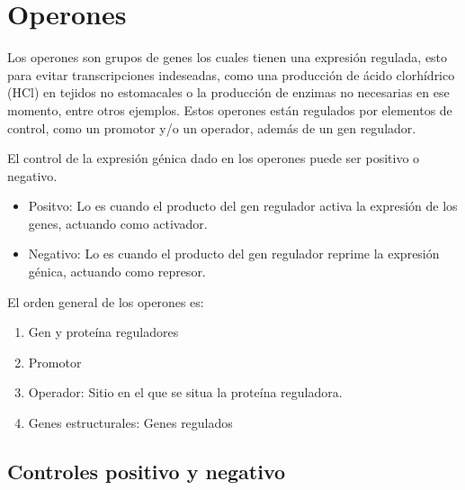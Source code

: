 

\section{Operones}

Los operones son grupos de genes los cuales tienen una expresión regulada, esto para evitar transcripciones indeseadas, como una producción de ácido clorhídrico (HCl) en tejidos no estomacales o la producción de enzimas no necesarias en ese momento, entre otros ejemplos. Estos operones están regulados por elementos de control, como un promotor y/o un operador, además de un gen regulador.

El control de la expresión génica dado en los operones puede ser positivo o negativo.

\begin{itemize}
    \item Positvo: Lo es cuando el producto del gen regulador activa la expresión de los genes, actuando como activador.
    \item Negativo: Lo es cuando el producto del gen regulador reprime la expresión génica, actuando como represor.
\end{itemize}

El orden general de los operones es:

\begin{enumerate}
    \item Gen y proteína reguladores
    \item Promotor
    \item Operador: Sitio en el que se situa la proteína reguladora.
    \item Genes estructurales: Genes regulados
\end{enumerate}

\subsection{Controles positivo y negativo}



